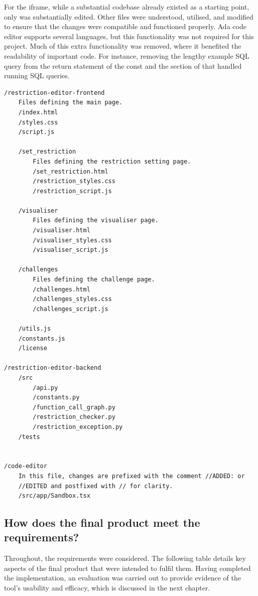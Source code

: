 For the iframe, while a substantial codebase already existed as a starting point, only  was substantially edited. Other files were understood, utilised, and modified to ensure that the changes were compatible and functioned properly. Ada code editor supports several languages, but this functionality was not required for this project. Much of this extra functionality was removed, where it benefited the readability of important code. For instance, removing the lengthy example SQL query from the return statement of the const  and the section of  that handled running SQL queries.

\begin{verbatim}
/restriction-editor-frontend
    Files defining the main page.
    /index.html
    /styles.css                     
    /script.js
    
    /set_restriction
        Files defining the restriction setting page.
        /set_restriction.html
        /restriction_styles.css
        /restriction_script.js
        
    /visualiser
        Files defining the visualiser page. 
        /visualiser.html
        /visualiser_styles.css
        /visualiser_script.js

    /challenges
        Files defining the challenge page.
        /challenges.html
        /challenges_styles.css
        /challenges_script.js

    /utils.js
    /constants.js
    /license 

/restriction-editor-backend
    /src
        /api.py
        /constants.py
        /function_call_graph.py
        /restriction_checker.py
        /restriction_exception.py
    /tests
        

/code-editor
    In this file, changes are prefixed with the comment //ADDED: or 
    //EDITED and postfixed with // for clarity.
    /src/app/Sandbox.tsx
\end{verbatim}

\subsection{How does the final product meet the requirements?}

Throughout, the requirements were considered. The following table details key aspects of the final product that were intended to fulfil them. Having completed the implementation, an evaluation was carried out to provide evidence of the tool's usability and efficacy, which is discussed in the next chapter.

